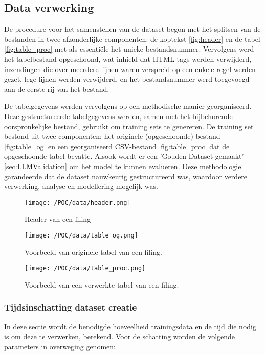 \subsection{Data verwerking}
De procedure voor het samenstellen van de dataset begon met het splitsen van de bestanden in twee afzonderlijke componenten: de koptekst \autoref{fig:header} en de tabel \autoref{fig:table_proc} met als essentiële het unieke bestandsnummer. Vervolgens werd het tabelbestand opgeschoond, wat inhield dat HTML-tags werden verwijderd, inzendingen die over meerdere lijnen waren verspreid op een enkele regel werden gezet, lege lijnen werden verwijderd, en het bestandsnummer werd toegevoegd aan de eerste rij van het bestand.

De tabelgegevens werden vervolgens op een methodische manier georganiseerd. Deze gestructureerde tabelgegevens werden, samen met het bijbehorende oorspronkelijke bestand, gebruikt om training sets te genereren. De training set bestond uit twee componenten: het originele (opgeschoonde) bestand \autoref{fig:table_og} en een georganiseerd CSV-bestand \autoref{fig:table_proc} dat de opgeschoonde tabel bevatte. Alsook wordt er een 'Gouden Dataset gemaakt' \autoref{sec:LLMValidation} om het model te kunnen evalueren.  Deze methodologie garandeerde dat de dataset nauwkeurig gestructureerd was, waardoor verdere verwerking, analyse en modellering mogelijk was.

  \begin{figure}[H]
    \centering        
    \texttt{[image: /POC/data/header.png]}
    \caption{Header van een filing}
    \label{fig:header}
\end{figure}

\begin{figure}[H]
    \centering        
    \texttt{[image: /POC/data/table\_og.png]}
    \caption{Voorbeeld van originele tabel van een filing.}
    \label{fig:table_og}
\end{figure}
\begin{figure}[H]
    \centering        
    \texttt{[image: /POC/data/table\_proc.png]}
    \caption{Voorbeeld van een verwerkte tabel van een filing.}
    \label{fig:table_proc}
\end{figure}

\subsubsection{Tijdsinschatting dataset creatie}
\label{sec:tijdberekenen}
In deze sectie wordt de benodigde hoeveelheid trainingsdata en de tijd die nodig is om deze te verwerken, berekend. Voor de schatting worden de volgende parameters in overweging genomen:



